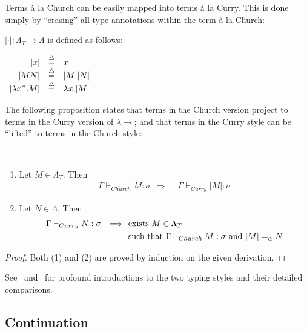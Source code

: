 Terms \`{a} la Church can be easily mapped into terms \`{a} la Curry. This is done simply by ``erasing'' all type annotations within the term \`{a} la Church:
\begin{definition} $| \cdot |: \Lambda_T \rightarrow \Lambda$ is defined as follows:
\begin{center}
$
\begin{array}{rcl}
|x|& \stackrel{{\scriptstyle\triangle}}{=} & x \\
|MN|& \stackrel{{\scriptstyle\triangle}}{=} & |M||N| \\
|\lambda x^{\sigma}.M|& \stackrel{{\scriptstyle\triangle}}{=} & \lambda x.|M|
\end{array}
$
\end{center}
\end{definition}
The following proposition states that terms in the Church version project to terms in the Curry version of $\lambda\!\rightarrow$; and that terms in the Curry style can be ``lifted'' to terms in the Church style:
\begin{proposition}  
\ 
\begin{enumerate}
\item Let $M \in \Lambda_T$. Then
\begin{align*}
\Gamma \vdash_{Church} M:\sigma  \ \ \Longrightarrow \ \ & \Gamma \vdash_{Curry} |M|:\sigma
\end{align*}
\item Let $N\in \Lambda$. Then
\begin{align*}
\Gamma \vdash_{Curry} N:\sigma  \ \  \Longrightarrow \ \ & \text{exists } M  \in \Lambda_T  \\
& \text{such that }  \Gamma \vdash_{Church}  M:\sigma \text{ and } |M| =_{\alpha} N
\end{align*}
\end{enumerate}
\end{proposition}
\begin{proof} Both (1) and (2) are proved by induction on the given derivation.
\end{proof}
See~\cite{Barendregt:1992:Lambda-Calculi-with-Types}  and~\cite{HindleySeldin:2008:Lambda-Calculus-and-Combinators-an-Introduction} for profound introductions to the two typing styles and their detailed comparisons.


\subsection{Continuation} \label{subsec:Continuation}

